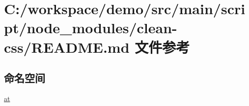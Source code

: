 \hypertarget{node__modules_2clean-css_2_r_e_a_d_m_e_8md}{}\section{C\+:/workspace/demo/src/main/script/node\+\_\+modules/clean-\/css/\+R\+E\+A\+D\+ME.md 文件参考}
\label{node__modules_2clean-css_2_r_e_a_d_m_e_8md}
\subsection*{命名空间}
\begin{DoxyCompactItemize}
\item 
 \mbox{\hyperlink{namespaceat}{at}}
\end{DoxyCompactItemize}
